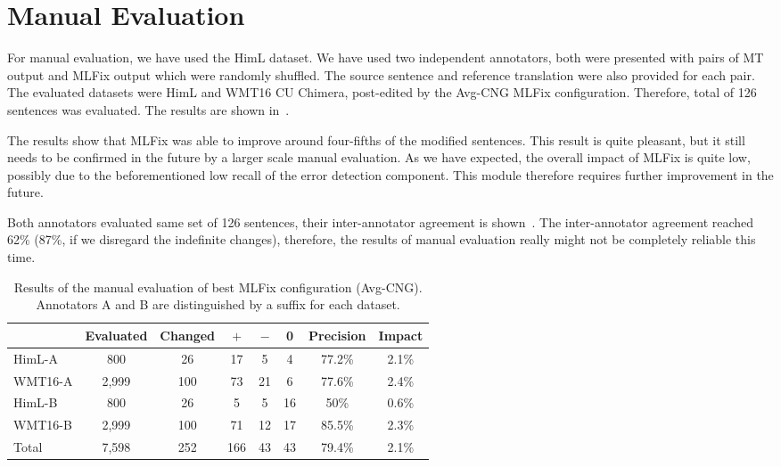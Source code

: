 \section{Manual Evaluation}

For manual evaluation, we have used the HimL dataset. We have used two independent annotators, both were presented with pairs
of MT output and MLFix output which were randomly shuffled. The source sentence and reference translation were also provided for each pair.
The evaluated datasets were HimL and WMT16 CU Chimera, post-edited by the Avg-CNG MLFix configuration. Therefore, total
of 126 sentences was evaluated. The results are shown in~.

The results show that MLFix was able to improve around four-fifths of the modified sentences. This
result is quite pleasant, but it still needs to be confirmed in the future by a larger scale manual
evaluation. As we have expected, the overall impact of MLFix is quite low, possibly due to the beforementioned
low recall of the error detection component. This module therefore requires further improvement
in the future.

Both annotators evaluated same set of 126 sentences, their inter-annotator agreement is shown~.
The inter-annotator agreement reached 62\% (87\%, if we disregard the indefinite changes),
therefore, the results of manual evaluation really might not be completely reliable this time.

\begin{table*}[t]
\centering
\small

\begin{tabular}{l|cc|ccc|cc}
  &  Evaluated  &  Changed  &  $+$  &  $-$  &  0  &  Precision  &  Impact  \\
\hline
HimL-A  &  800  &  26  &  17  &  5  &  4  &  77.2\%  &  2.1\%  \\
WMT16-A  &  2,999  &  100  &  73  &  21  &  6  &  77.6\%  &  2.4\%  \\
HimL-B  &  800  &  26  &  5  &  5  &  16  &  50\%  &  0.6\%  \\
WMT16-B  &  2,999  &  100  &  71  &  12  &  17  &  85.5\%  &  2.3\%  \\
\hline
Total &  7,598  &  252  &  166  &  43  &  43  &  79.4\%  &  2.1\%  \\
\end{tabular}
\caption{
Results of the manual evaluation of best MLFix configuration (Avg-CNG). Annotators
A and B are distinguished by a suffix for each dataset.
}
\label{maneval-final}
\end{table*}


